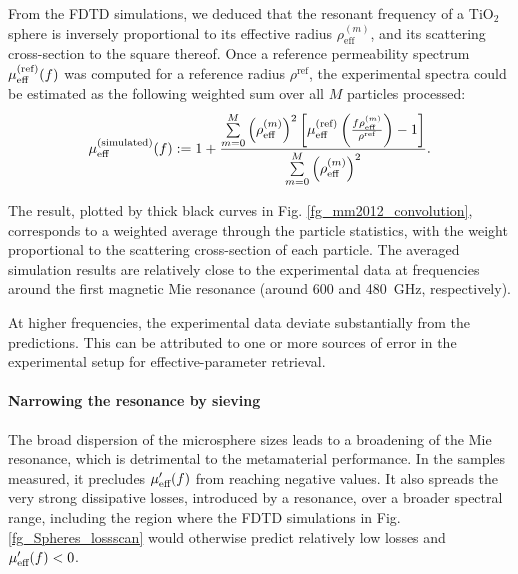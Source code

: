 From the FDTD simulations, we deduced that the resonant frequency of a TiO$_{2}$ sphere is inversely proportional to its effective radius $\rho_{\text{eff}}^{(m)}$, and its scattering cross-section to the square thereof. Once a reference permeability spectrum $\mu_{\text{eff} }^{\text{(ref)}}(f)$ was computed for a reference radius $\rho^{\text{ref}}$, the experimental spectra could be estimated as the following weighted sum over all $M$ particles processed:
\begin{equation} \mu_{\text{eff} }^{\text{(simulated)}}(f) := 1 + \frac{\sum\limits_{m=0}^{M} \left(\rho_{\text{eff}}^{(m)}\right)^{2} \left[ \mu_{\text{eff} }^{\text{(ref)}}\left(\frac{f \rho_{\text{eff}}^{(m)}}{\rho^{\text{ref}} }\right) - 1 \right]}{\sum\limits_{m=0}^{M} \left(\rho_{\text{eff}}^{(m)}\right)^{2}}. \label{eq_sumconvol}\end{equation}

	The result, plotted by thick black curves in Fig. \ref{fg_mm2012_convolution}, corresponds to a weighted average through the particle statistics, with the weight proportional to the scattering cross-section of each particle. The averaged simulation results are relatively close to the experimental data at frequencies around the first magnetic Mie resonance (around 600 and 480~GHz, respectively). 
	
	At higher frequencies, the experimental data deviate substantially from the predictions. This can be attributed to one or more sources of error in the experimental setup for effective-parameter retrieval.



\paragraph{Narrowing the resonance by sieving} %
The broad dispersion of the microsphere sizes leads to a broadening of the Mie resonance, which is detrimental to the metamaterial performance. In the samples measured, it precludes $\mu_{\text{eff} }'(f)$ from reaching negative values. It also spreads the very strong dissipative losses, introduced by a resonance, over a broader spectral range, including the region where the FDTD simulations in Fig. \ref{fg_Spheres_lossscan} would otherwise predict relatively low losses and $\mu_{\text{eff} }'(f) < 0$.


